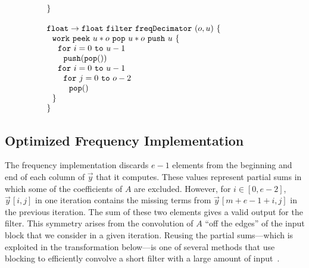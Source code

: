 \begin{transformation}
\begin{equation}
{\begin{array}{ll}
    {\tt \}} \\ ~ \\
    {\tt float \rightarrow float}~{\tt filter~freqDecimator~}(o, u){\tt ~\{} & \hspace{40pt}\\
    ~~{\tt work~}{\tt peek}~u*o~{\tt pop}~u*o~{\tt push}~u~{\tt \{} \\
    ~~~~{\tt for}~i=0~{\tt to}~u-1 \\
    ~~~~~~{\tt push(pop())} \\
    ~~~~{\tt for}~i=0~{\tt to}~u-1 \\
    ~~~~~~{\tt for}~j=0~{\tt to}~o-2 \\
    ~~~~~~~~{\tt pop()} \\
    ~~{\tt \}} \\
    {\tt \}}
  \end{array}}
\end{equation}
\vspace{-6pt}
\end{transformation}

\subsection{Optimized Frequency Implementation}

The {\naive} frequency implementation discards $e-1$ elements from the
beginning and end of each column of ${\vec y}$ that it computes.
These values represent partial sums in which some of the coefficients
of $A$ are excluded. However, for $i \in [0, e-2]$, ${\vec
y}\hspace{1pt}[i,j]$ in one iteration contains the missing terms from
${\vec y}\hspace{1pt}[m+e-1+i,j]$ in the previous iteration.  The sum
of these two elements gives a valid output for the filter.  This
symmetry arises from the convolution of $A$ ``off the edges'' of the
input block that we consider in a given iteration. Reusing the partial
sums---which is exploited in the transformation below---is one of
several methods that use blocking to efficiently convolve a short
filter with a large amount of input~\cite{oppenheim-discrete}.


